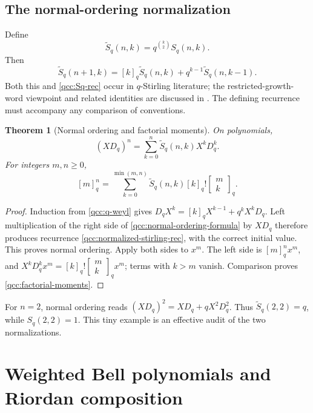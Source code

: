 \documentclass[11pt,a4paper,oneside,openany]{book}
\newtheorem{theorem}{Theorem}[chapter]
\theoremstyle{definition}
\theoremstyle{remark}
\newcommand{\GB}[3][q]{\begin{bmatrix}#2\\#3\end{bmatrix}_{#1}}
\begin{document}
\section{The normal-ordering normalization}
Define
\begin{equation}\label{qcc:normalized-stirling}
 \widetilde S_q(n,k)=q^{\binom k2}S_q(n,k).
\end{equation}
Then
\begin{equation}\label{qcc:normalized-stirling-rec}
 \widetilde S_q(n+1,k)=[k]_q\widetilde S_q(n,k)
                         +q^{k-1}\widetilde S_q(n,k-1).
\end{equation}
Both this and \eqref{qcc:Sq-rec} occur in \(q\)-Stirling literature; the
restricted-growth-word viewpoint and related identities are discussed in
\cite{cai}. The defining recurrence must accompany any comparison of conventions.

\begin{theorem}[Normal ordering and factorial moments]\label{qcc:normal-ordering}
On polynomials,
\begin{equation}\label{qcc:normal-ordering-formula}
 (XD_q)^n=\sum_{k=0}^n\widetilde S_q(n,k)X^kD_q^k.
\end{equation}
For integers \(m,n\ge0\),
\begin{equation}\label{qcc:factorial-moments}
 [m]_q^n=\sum_{k=0}^{\min(m,n)}
          \widetilde S_q(n,k)[k]_q!\GB mk.
\end{equation}
\end{theorem}
\begin{proof}
Induction from \eqref{qcc:q-weyl} gives
\(D_qX^k=[k]_qX^{k-1}+q^kX^kD_q\).
Left multiplication of the right side of \eqref{qcc:normal-ordering-formula}
by \(XD_q\) therefore produces recurrence
\eqref{qcc:normalized-stirling-rec}, with the correct initial value.
This proves normal ordering.
Apply both sides to \(x^m\). The left side is \([m]_q^nx^m\), and
\(X^kD_q^kx^m=[k]_q!\GB mk x^m\); terms with \(k>m\) vanish.
Comparison proves \eqref{qcc:factorial-moments}.
\end{proof}
For \(n=2\), normal ordering reads
\((XD_q)^2=XD_q+qX^2D_q^2\). Thus
\(\widetilde S_q(2,2)=q\), while \(S_q(2,2)=1\). This tiny example is an
effective audit of the two normalizations.

\chapter{Weighted Bell polynomials and Riordan composition}
\label{qcc:composition}
\end{document}
